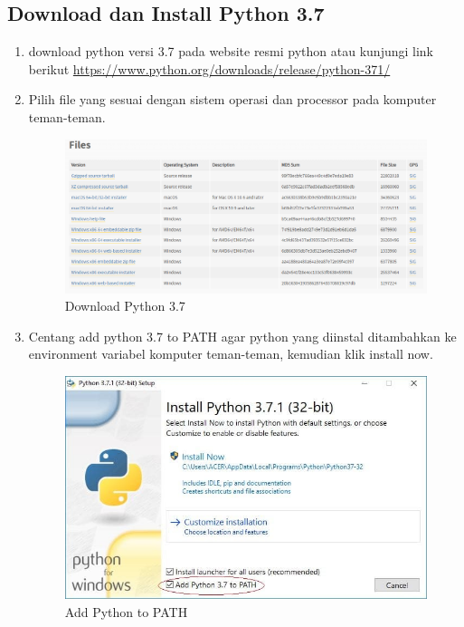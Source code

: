 \subsection{Download dan Install Python 3.7}
\begin{enumerate}
\item download python versi 3.7 pada website resmi python atau kunjungi link berikut \small \url{https://www.python.org/downloads/release/python-371/}

\item Pilih file yang sesuai dengan sistem operasi dan processor pada komputer teman-teman.
\begin{figure}[H]
\centering
\includegraphics[scale=.35]{figures/python1}
\caption{Download Python 3.7}
\label{python1}
\end{figure}

\item Centang add python 3.7 to PATH agar python yang diinstal ditambahkan ke environment variabel komputer teman-teman, kemudian klik install now.
\begin{figure}[H]
\centering
\includegraphics[scale=.4]{figures/python2}
\caption{Add Python to PATH}
\label{python2}
\end{figure}


\end{enumerate}
